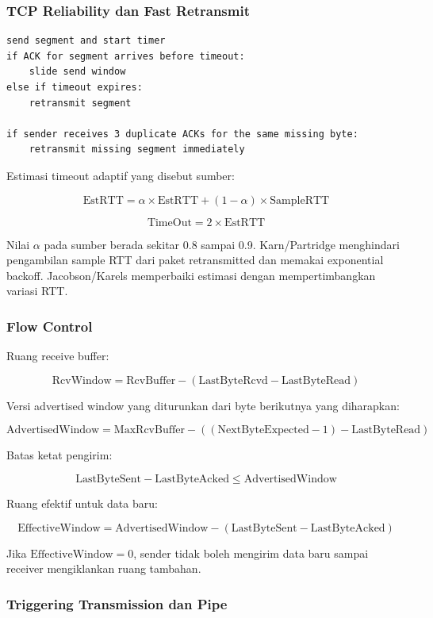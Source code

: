 \subsubsection*{TCP Reliability dan Fast Retransmit}

\begin{lstlisting}[language={},caption={Intuisi reliability TCP}]
send segment and start timer
if ACK for segment arrives before timeout:
    slide send window
else if timeout expires:
    retransmit segment

if sender receives 3 duplicate ACKs for the same missing byte:
    retransmit missing segment immediately
\end{lstlisting}

Estimasi timeout adaptif yang disebut sumber:

\[
\text{EstRTT} = \alpha \times \text{EstRTT} + (1-\alpha) \times \text{SampleRTT}
\]

\[
\text{TimeOut} = 2 \times \text{EstRTT}
\]

Nilai $\alpha$ pada sumber berada sekitar 0.8 sampai 0.9. Karn/Partridge menghindari pengambilan sample RTT dari paket retransmitted dan memakai exponential backoff. Jacobson/Karels memperbaiki estimasi dengan mempertimbangkan variasi RTT.

\subsubsection*{Flow Control}

Ruang receive buffer:

\[
\text{RcvWindow} = \text{RcvBuffer} - (\text{LastByteRcvd} - \text{LastByteRead})
\]

Versi advertised window yang diturunkan dari byte berikutnya yang diharapkan:

\[
\text{AdvertisedWindow} = \text{MaxRcvBuffer} - ((\text{NextByteExpected}-1)-\text{LastByteRead})
\]

Batas ketat pengirim:

\[
\text{LastByteSent} - \text{LastByteAcked} \leq \text{AdvertisedWindow}
\]

Ruang efektif untuk data baru:

\[
\text{EffectiveWindow} = \text{AdvertisedWindow} - (\text{LastByteSent}-\text{LastByteAcked})
\]

Jika $\text{EffectiveWindow}=0$, sender tidak boleh mengirim data baru sampai receiver mengiklankan ruang tambahan.

\subsubsection*{Triggering Transmission dan Pipe}

